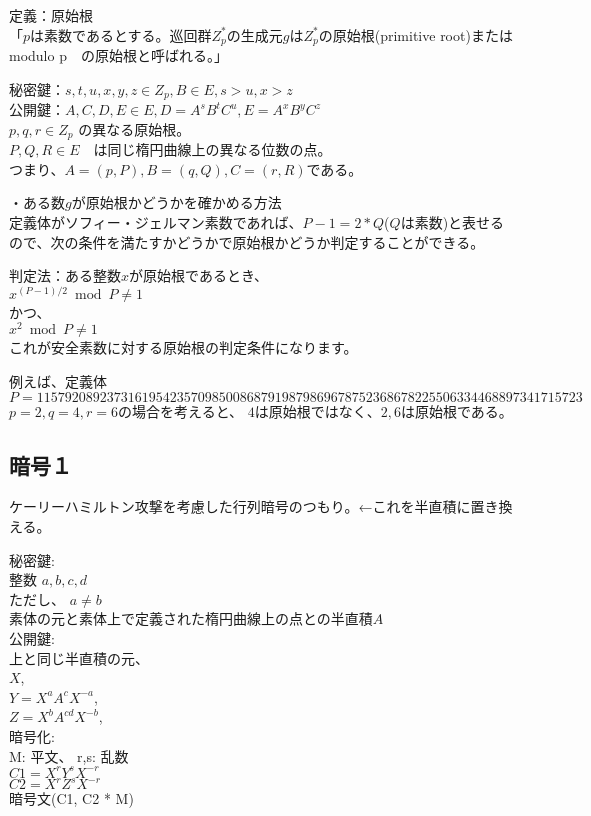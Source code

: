 \documentclass[
]{article}
\begin{document}
定義：原始根\\
「\(p\)は素数であるとする。巡回群\(Z^*_p\)の生成元\(g\)は\(Z^*_p\)の原始根(primitive
root)またはmodulo p　の原始根と呼ばれる。」

秘密鍵：\(s,t,u,x,y,z \in Z_p,B \in E,s > u, x > z\)\\
公開鍵：\(A,C,D,E \in E,D=A^sB^tC^u,E=A^xB^yC^z\)\\
\(p,q,r \in Z_p\) の異なる原始根。\\
\(P,Q,R \in E\)　は同じ楕円曲線上の異なる位数の点。\\
つまり、\(A=(p,P),B=(q,Q),C=(r,R)\)である。

・ある数\(g\)が原始根かどうかを確かめる方法\\
定義体がソフィー・ジェルマン素数であれば、\(P-1=2*Q\)(\(Q\)は素数)と表せるので、次の条件を満たすかどうかで原始根かどうか判定することができる。

判定法：ある整数\(x\)が原始根であるとき、\\
\(x^{(P-1)/2} \bmod P \neq 1\)\\
かつ、\\
\(x^{2} \bmod P \neq 1\)\\
これが安全素数に対する原始根の判定条件になります。

例えば、定義体\\
\(P=115792089237316195423570985008687919879869678752368678225506334468897341715723\)\\
\(p=2,q=4,r=6\)の場合を考えると、
\(4\)は原始根ではなく、\(2,6\)は原始根である。

\hypertarget{ux6697ux53f7uxff11}{%
\subsection{暗号１}\label{ux6697ux53f7uxff11}}

ケーリーハミルトン攻撃を考慮した行列暗号のつもり。←これを半直積に置き換える。

秘密鍵:\\
整数 \(a,b,c,d\)\\
ただし、 \(a \neq b\)\\
素体の元と素体上で定義された楕円曲線上の点との半直積\(A\)\\
公開鍵:\\
上と同じ半直積の元、\\
\(X\),\\
\(Y = X^a A^c X^{-a}\),\\
\(Z = X^b A^{cd} X^{-b}\),\\
暗号化:\\
M: 平文、 r,s: 乱数\\
\(C1 = X^r Y^s X^{-r}\)\\
\(C2 = X^r Z^s X^{-r}\)\\
暗号文(C1, C2 * M)
\end{document}
